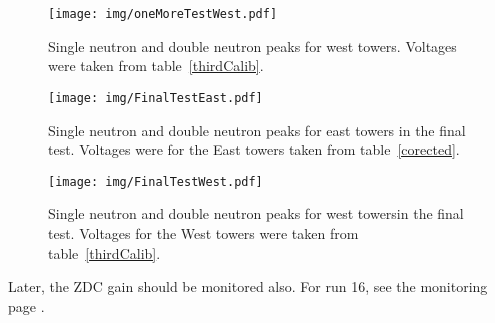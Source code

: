 \begin{figure}[htb]
\begin{center}
\texttt{[image: img/oneMoreTestWest.pdf]}
\end{center}
\caption{Single neutron and double neutron peaks for west towers. 
Voltages were taken from table~\ref{thirdCalib}.}
\label{oneMoreTestWest}
\end{figure}

\begin{figure}[htb]
\begin{center}
\texttt{[image: img/FinalTestEast.pdf]}
\end{center}
\caption{Single neutron and double neutron peaks for east towers in the final test. Voltages were
for the East towers taken from table~\ref{corected}.}
\label{finalTestEast}
\end{figure}

\begin{figure}[htb]
\begin{center}
\texttt{[image: img/FinalTestWest.pdf]}
\end{center}
\caption{Single neutron and double neutron peaks for west towersin the final test. Voltages
for the West towers were taken from table~\ref{thirdCalib}.}
\label{finalTestWest}
\end{figure}

Later, the ZDC gain should be monitored also. For run 16, see the monitoring page \cite{ZDCmonPage}.